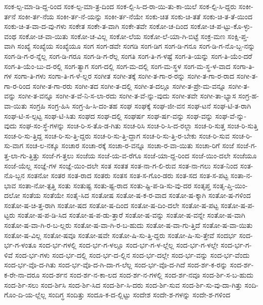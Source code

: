 {ಸಂಕ-ಲ್ಪ-ಮಾ-ಡಿ-ದ್ದ-ರಿಂದ
ಸಂಕ-ಲ್ಪ-ಮಾ-ತ್ರ-ದಿಂದ
ಸಂಕ-ಲ್ಪಿ-ಸಿ-ದ-ರಾ-ಯಿ-ತು-ಕಾ-ಯಿಲೆ
ಸಂಕ-ಲ್ಪಿ-ಸಿ-ದ್ದರು
ಸಂಕೀ-ರ್ತನೆ
ಸಂಕೀ-ರ್ತ-ನೆಯ
ಸಂಕೀ-ರ್ತ-ನೆ-ಯನ್ನು
ಸಂಕೀ-ರ್ತ-ನೆಯೇ
ಸಂಕು-ಚಿತ
ಸಂಕು-ಚಿ-ತತೆ
ಸಂಕು-ಚಿ-ತ-ತೆ-ಯಿಂದ
ಸಂಕು-ಚಿ-ತ-ವಾ-ದ-ವು-ಗಳು
ಸಂಕೇತ
ಸಂಕೇ-ತ-ವಾಗಿ
ಸಂಕೇ-ತವೇ
ಸಂಕೋ-ಚ-ದಿಂದ
ಸಂಕೋ-ಚ-ಪ-ಟ್ಟು-ಕೊ-ಳ್ಳು-ವಂಥ
ಸಂಕೋ-ಚ-ವಾ-ಯಿತು
ಸಂಕೋ-ಚ-ವಿಲ್ಲ
ಸಂಕೋ-ಲೆಯ
ಸಂಕೋ-ಲೆ-ಯಾ-ಗಿ-ಬಿಟ್ಟೆ
ಸಂಕ್ರ-ಮಣ
ಸಂಕ್ಷಿ-ಪ್ತ-ವಾಗಿ
ಸಂಖ್ಯೆ
ಸಂಖ್ಯೆಯ
ಸಂಖ್ಯೆಯೂ
ಸಂಗ
ಸಂಗ-ಡವೇ
ಸಂಗಡಿ
ಸಂಗ-ಡಿಗ
ಸಂಗ-ಡಿ-ಗನೂ
ಸಂಗ-ಡಿ-ಗ-ನೊ-ಬ್ಬ-ನನ್ನು
ಸಂಗ-ಡಿ-ಗ-ರ-ನ್ನೆಲ್ಲ
ಸಂಗ-ಡಿ-ಗರೂ
ಸಂಗ-ಡಿ-ಗ-ರೆಲ್ಲ
ಸಂಗತಿ
ಸಂಗ-ತಿ-ಗ-ಳಷ್ಟೆ
ಸಂಗ-ತಿ-ಯನ್ನು
ಸಂಗ-ತಿ-ಯೆಂ-ದರೆ
ಸಂಗ-ತಿ-ಯೆಂ-ಬು-ದ-ರಲ್ಲಿ
ಸಂಗ-ತ್ಯಾಗ
ಸಂಗ-ದಲ್ಲಿ
ಸಂಗ-ಮ-ದಲ್ಲಿ
ಸಂಗ-ಮ-ಸ್ಥಳ
ಸಂಗ-ಮ-ಸ್ಥ-ಳ-ವಾದ
ಸಂಗಾ-ತಿ-ಗಳ
ಸಂಗಾ-ತಿ-ಗಳು
ಸಂಗಾ-ತಿ-ಗ-ಳೆ-ಲ್ಲರ
ಸಂಗೀತ
ಸಂಗೀ-ತಕ್ಕೆ
ಸಂಗೀ-ತ-ಗಾ-ರ-ರನ್ನು
ಸಂಗೀ-ತ-ಗಾ-ರ-ರಾದ
ಸಂಗೀ-ತ-ಗಾ-ರ-ರಿಂದ
ಸಂಗೀ-ತ-ಗಾ-ರರು
ಸಂಗೀ-ತದ
ಸಂಗೀ-ತ-ದಲ್ಲಿ
ಸಂಗೀ-ತ-ದಲ್ಲೂ
ಸಂಗೀ-ತ-ಪ್ರೇ-ಮ-ವನ್ನೂ
ಸಂಗೀ-ತ-ವನ್ನು
ಸಂಗೀ-ತ-ವನ್ನೂ
ಸಂಗೀ-ತ-ವೆ-ನಿ-ಸ-ಲಾ-ರದು
ಸಂಗೀ-ತ-ವೆ-ನ್ನು-ವುದು
ಸಂಗೀ-ತವೇ
ಸಂಗೀ-ತಾ-ಭ್ಯಾಸ
ಸಂಗ್ರ-ಹ-ವಾ-ಯಿತು
ಸಂಗ್ರಹಿ
ಸಂಗ್ರ-ಹಿಸಿ
ಸಂಗ್ರ-ಹಿ-ಸಿ-ದಂ-ತಹ
ಸಂಘ
ಸಂಘಕ್ಕೆ
ಸಂಘ-ಜೀ-ವನ
ಸಂಘ-ಟನೆ
ಸಂಘ-ಟಿ-ತ-ರಾಗಿ
ಸಂಘ-ಟಿ-ಸ-ಲ್ಪಟ್ಟ
ಸಂಘ-ಟಿ-ಸಿತು
ಸಂಘದ
ಸಂಘ-ದಲ್ಲಿ
ಸಂಘರ್ಷ
ಸಂಘ-ರ್ಷ-ವನ್ನು
ಸಂಘ-ವನ್ನು
ಸಂಘ-ವೆ-ನ್ನು-ವುದು
ಸಂಘ-ಸಂ-ಸ್ಥೆ-ಗಳನ್ನು
ಸಂಚ-ರಿ-ಸ-ತೊ-ಡ-ಗಿತು
ಸಂಚ-ರಿಸಿ
ಸಂಚ-ರಿ-ಸಿ-ದ-ರಲ್ಲಾ
ಸಂಚ-ರಿ-ಸುತ್ತ
ಸಂಚ-ರಿ-ಸುತ್ತಿ
ಸಂಚ-ರಿ-ಸು-ತ್ತಿದ್ದ
ಸಂಚ-ರಿ-ಸು-ತ್ತಿ-ದ್ದರು
ಸಂಚ-ರಿ-ಸು-ತ್ತಿ-ದ್ದಾಗ
ಸಂಚ-ರಿ-ಸು-ತ್ತಿ-ರ-ಬೇಕು
ಸಂಚ-ರಿ-ಸುವ
ಸಂಚ-ರಿ-ಸು-ವಾಗ
ಸಂಚ-ಲ-ನಕ್ಕೂ
ಸಂಚಾರ
ಸಂಚಾ-ರಕ್ಕೆ
ಸಂಚಾ-ರ-ವನ್ನೂ
ಸಂಚಾ-ರ-ವಾ-ಯಿತು
ಸಂಚಾ-ರಿಗೆ
ಸಂಜೆ
ಸಂಜೆ-ಗ-ತ್ತ-ಲಾ-ಗು-ತ್ತಿತ್ತು
ಸಂಜೆ-ಗ-ತ್ತಲು
ಸಂಜೆಯ
ಸಂಜೆ-ಯ-ವ-ರೆಗೂ
ಸಂಜೆ-ಯಾ-ದ್ದ-ರಿಂದ
ಸಂಜೆ-ಯಿಂ-ದಲೇ
ಸಂಜೆಯೂ
ಸಂಜೆ-ಯೆಲ್ಲ
ಸಂಜ್ಞೆ-ಗಳ
ಸಂಜ್ಞೆ-ಯಿಂ-ದಲೇ
ಸಂತ
ಸಂತತ
ಸಂತ-ನಾ-ಗ-ಲಿ-ರುವ
ಸಂತ-ನಾ-ಗಲು
ಸಂತ-ನಿಂದ
ಸಂತ-ನೊ-ಬ್ಬನ
ಸಂತನೋ
ಸಂತರ
ಸಂತ-ರಾದ
ಸಂತರು
ಸಂತಸ
ಸಂತ-ಸ-ಗೊಂ-ಡರು
ಸಂತ-ಸದ
ಸಂತ-ಸ-ಪಟ್ಟ
ಸಂತಾ-ನ-ಭಾವ
ಸಂತಾ-ನೋ-ತ್ಪತ್ತಿ
ಸಂತು
ಸಂತುಷ್ಟ
ಸಂತು-ಷ್ಟ-ರಾದ
ಸಂತು-ಷ್ಟಿ-ಪ-ಡಿ-ಸು-ವು-ದರ
ಸಂತೃಪ್ತ
ಸಂತೃ-ಪ್ತಿ-ಯಿಂ-ದಲೋ
ಸಂತೆಯ
ಸಂತೆಯೇ
ಸಂತೈ-ಸಿದ
ಸಂತೋಷ
ಸಂತೋ-ಷ-ಕ-ರ-ವಾದ
ಸಂತೋ-ಷ-ಕ್ಕಾಗಿ
ಸಂತೋ-ಷ-ಗಳಿಂದ
ಸಂತೋ-ಷ-ಚಿ-ತ್ತ-ರಾಗಿ
ಸಂತೋ-ಷದ
ಸಂತೋ-ಷ-ದಿಂದ
ಸಂತೋ-ಷ-ದಿಂ-ದಲೇ
ಸಂತೋ-ಷ-ಪಟ್ಟ
ಸಂತೋ-ಷ-ಪ-ಟ್ಟರು
ಸಂತೋ-ಷ-ಪ-ಡಿ-ಸಿದ
ಸಂತೋ-ಷ-ಪ-ಡು-ತ್ತಾರೆ
ಸಂತೋ-ಷ-ವನ್ನು
ಸಂತೋ-ಷ-ವನ್ನೇ
ಸಂತೋ-ಷ-ವಾಗಿ
ಸಂತೋ-ಷ-ವಾ-ಗಿ-ರ-ಬ-ಲ್ಲರು
ಸಂತೋ-ಷ-ವಾ-ಗಿ-ರ-ಬ-ಹುದು
ಸಂತೋ-ಷ-ವಾ-ಗು-ತ್ತಿದೆ
ಸಂತೋ-ಷ-ವಾ-ಯಿತು
ಸಂತೋ-ಷ-ವಿಲ್ಲ
ಸಂತೋ-ಷವೂ
ಸಂತೋ-ಷವೇ
ಸಂತೋ-ಷಿ-ಸು-ತ್ತಿ-ದ್ದರು
ಸಂತೋ-ಷಿ-ಸು-ತ್ತೇವೆ
ಸಂದರ್ಭ
ಸಂದ-ರ್ಭ-ಗ-ಳಂತೂ
ಸಂದ-ರ್ಭ-ಗಳಲ್ಲಿ
ಸಂದ-ರ್ಭ-ಗ-ಳಲ್ಲೂ
ಸಂದ-ರ್ಭ-ಗ-ಳ-ಲ್ಲೆಲ್ಲ
ಸಂದ-ರ್ಭ-ಗ-ಳಲ್ಲೇ
ಸಂದ-ರ್ಭ-ಗ-ಳಿವೆ
ಸಂದ-ರ್ಭ-ಗಳು
ಸಂದ-ರ್ಭ-ದಲ್ಲಿ
ಸಂದ-ರ್ಭ-ದ-ಲ್ಲಿನ
ಸಂದ-ರ್ಭ-ದಲ್ಲೇ
ಸಂದ-ರ್ಭ-ವನ್ನು
ಸಂದ-ರ್ಭ-ವೆಂದು
ಸಂದ-ರ್ಭ-ವೊ-ದ-ಗಿತು
ಸಂದ-ರ್ಭ-ವೊ-ದ-ಗಿ-ದಾ-ಗ-ಲೆಲ್ಲ
ಸಂದ-ರ್ಭ-ವೊ-ದ-ಗಿದೆ
ಸಂದ-ರ್ಶ-ಕ-ರನ್ನು
ಸಂದ-ರ್ಶ-ಕ-ರೇ-ನಾ-ದರೂ
ಸಂದ-ರ್ಶನ
ಸಂದ-ರ್ಶ-ನ-ಕಾ-ಲದ
ಸಂದ-ರ್ಶ-ನ-ಗಳಲ್ಲಿ
ಸಂದ-ರ್ಶ-ನವೂ
ಸಂದ-ರ್ಶಿ-ಸ-ಬ-ಹುದು
ಸಂದ-ರ್ಶಿ-ಸಲು
ಸಂದ-ರ್ಶಿಸಿ
ಸಂದ-ರ್ಶಿ-ಸಿದ
ಸಂದ-ರ್ಶಿ-ಸಿ-ದರು
ಸಂದ-ರ್ಶಿ-ಸುವ
ಸಂದ-ರ್ಶಿ-ಸು-ವು-ದಾ-ಗಿತ್ತು
ಸಂದಿ-ಗೊಂ-ದಿ-ಯ-ಲ್ಲೆಲ್ಲ
ಸಂದಿಗ್ಧ
ಸಂದಿತ್ತು
ಸಂದೂ-ಕ-ದ-ಲ್ಲಿಟ್ಟು
ಸಂದೇಶ
ಸಂದೇ-ಶ-ಗಳನ್ನು
ಸಂದೇ-ಶ-ಗಳಿಂದ
}
